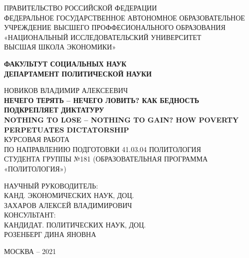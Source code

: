 \documentclass[a4paper, 12pt]{article}
\begin{document}
	    \thispagestyle{empty}
\begin{center}
 \small{ПРАВИТЕЛЬСТВО РОССИЙСКОЙ ФЕДЕРАЦИИ \\
\vspace{4ex}
  ФЕДЕРАЛЬНОЕ ГОСУДАРСТВЕННОЕ АВТОНОМНОЕ ОБРАЗОВАТЕЛЬНОЕ \\
  \vspace{2ex}
  УЧРЕЖДЕНИЕ ВЫСШЕГО ПРОФФЕСИОНАЛЬНОГО ОБРАЗОВАНИЯ \\ 
  \vspace{4ex}
  «НАЦИОНАЛЬНЫЙ ИССЛЕДОВАТЕЛЬСКИЙ УНИВЕРСИТЕТ \\
  \vspace{2ex}
  ВЫСШАЯ ШКОЛА ЭКОНОМИКИ»}
 \vspace{8ex}
 
 \normalsize{\textbf{ФАКУЛЬТУТ СОЦИАЛЬНЫХ НАУК \\}}
 \normalsize{\textbf{ДЕПАРТАМЕНТ ПОЛИТИЧЕСКОЙ НАУКИ \\}}
\end{center}
\vspace{10ex}
\begin{center}
 НОВИКОВ ВЛАДИМИР АЛЕКСЕЕВИЧ \\
 \vspace{4ex}
 \textbf{НЕЧЕГО ТЕРЯТЬ -- НЕЧЕГО ЛОВИТЬ? КАК БЕДНОСТЬ ПОДКРЕПЛЯЕТ ДИКТАТУРУ}\\
 \vspace{4ex}
 \textbf{NOTHING TO LOSE -- NOTHING TO GAIN? HOW POVERTY PERPETUATES DICTATORSHIP} \\
 \vspace{4ex}
 КУРСОВАЯ РАБОТА \\
 ПО НАПРАВЛЕНИЮ ПОДГОТОВКИ 41.03.04 ПОЛИТОЛОГИЯ \\
 СТУДЕНТА ГРУППЫ №181 (ОБРАЗОВАТЕЛЬНАЯ ПРОГРАММА «ПОЛИТОЛОГИЯ»)
\end{center}
\vspace{5ex}
\begin{flushright}
 \noindent
 НАУЧНЫЙ РУКОВОДИТЕЛЬ:
 \\
 КАНД. ЭКОНОМИЧЕСКИХ НАУК, ДОЦ.
 \\
 ЗАХАРОВ АЛЕКСЕЙ ВЛАДИМИРОВИЧ
 \\
 КОНСУЛЬТАНТ:
 \\
 КАНДИДАТ. ПОЛИТИЧЕСКИХ НАУК, ДОЦ.
 \\
 РОЗЕНБЕРГ ДИНА ЯНОВНА
\vspace{5ex}
\end{flushright}

\begin{center}
 \vfill
 МОСКВА -- 2021
\end{center}
	\newpage
	\setcounter{page}{1}
    
\end{document}
